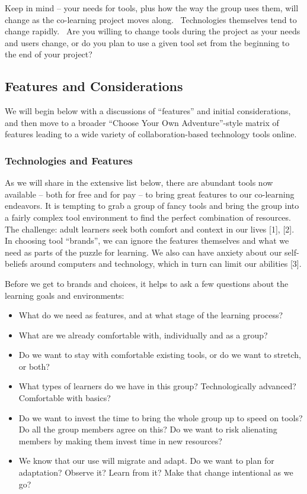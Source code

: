 Keep in mind -- your needs for tools, plus how the way the group uses
them, will change as the co-learning project moves along.~ Technologies
themselves tend to change rapidly.~ Are you willing to change tools
during the project as your needs and users change, or do you plan to use
a given tool set from the beginning to the end of your project?

\hypertarget{features-and-considerations}{%
\subsection{Features and
Considerations}\label{features-and-considerations}}

We will begin below with a discussions of ``features'' and initial
considerations, and then move to a broader ``Choose Your Own
Adventure''-style matrix of features leading to a wide variety of
collaboration-based technology tools online.

\hypertarget{technologies-and-features}{%
\subsubsection{Technologies and
Features}\label{technologies-and-features}}

As we will share in the extensive list below, there are abundant tools
now available -- both for free and for pay -- to bring great features to
our co-learning endeavors. It is tempting to grab a group of fancy tools
and bring the group into a fairly complex tool environment to find the
perfect combination of resources. The challenge: adult learners seek
both comfort and context in our lives {{[}1{]}}, {{[}2{]}}. In choosing
tool ``brands'', we can ignore the features themselves and what we need
as parts of the puzzle for learning. We also can have anxiety about our
self-beliefs around computers and technology, which in turn can limit
our abilities {{[}3{]}}.

Before we get to brands and choices, it helps to ask a few questions
about the learning goals and environments:

\begin{itemize}
\tightlist
\item
  What do we need as features, and at what stage of the learning
  process?
\item
  What are we already comfortable with, individually and as a group?
\item
  Do we want to stay with comfortable existing tools, or do we want to
  stretch, or both?
\item
  What types of learners do we have in this group? Technologically
  advanced? Comfortable with basics?
\item
  Do we want to invest the time to bring the whole group up to speed on
  tools? Do all the group members agree on this? Do we want to risk
  alienating members by making them invest time in new resources?
\item
  We know that our use will migrate and adapt. Do we want to plan for
  adaptation? Observe it? Learn from it? Make that change intentional as
  we go?
\end{itemize}

